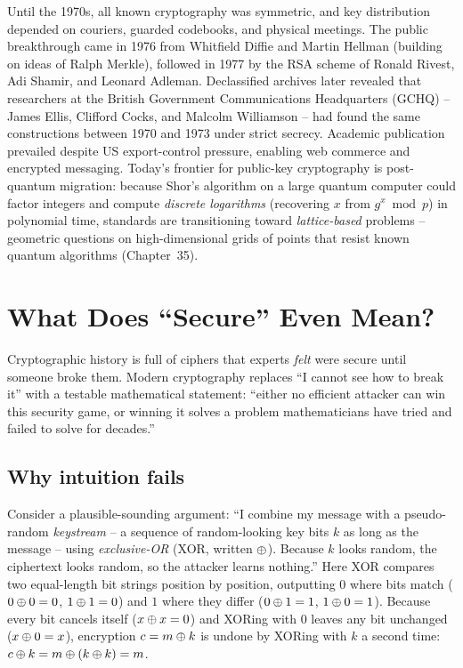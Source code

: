 \begin{historybox}
Until the 1970s, all known cryptography was symmetric, and key distribution depended on couriers, guarded codebooks, and physical meetings. The public breakthrough came in 1976 from Whitfield Diffie and Martin Hellman (building on ideas of Ralph Merkle), followed in 1977 by the RSA scheme of Ronald Rivest, Adi Shamir, and Leonard Adleman. Declassified archives later revealed that researchers at the British Government Communications Headquarters (GCHQ) -- James Ellis, Clifford Cocks, and Malcolm Williamson -- had found the same constructions between 1970 and 1973 under strict secrecy. Academic publication prevailed despite US export-control pressure, enabling web commerce and encrypted messaging. Today's frontier for public-key cryptography is post-quantum migration: because Shor's algorithm on a large quantum computer could factor integers and compute \emph{discrete logarithms} (recovering $x$ from $g^x \bmod p$) in polynomial time, standards are transitioning toward \emph{lattice-based} problems -- geometric questions on high-dimensional grids of points that resist known quantum algorithms (Chapter~35).
\end{historybox}

\section{What Does ``Secure'' Even Mean?}
\label{ch01:what-is-secure}

Cryptographic history is full of ciphers that experts \emph{felt} were secure until someone broke them. Modern cryptography replaces ``I cannot see how to break it'' with a testable mathematical statement: ``either no efficient attacker can win this security game, or winning it solves a problem mathematicians have tried and failed to solve for decades.''

\subsection*{Why intuition fails}

Consider a plausible-sounding argument: ``I combine my message with a pseudo-random \emph{keystream} -- a sequence of random-looking key bits $k$ as long as the message -- using \emph{exclusive-OR} (XOR, written $\oplus$). Because $k$ looks random, the ciphertext looks random, so the attacker learns nothing.'' Here XOR compares two equal-length bit strings position by position, outputting $0$ where bits match ($0 \oplus 0 = 0$, $1 \oplus 1 = 0$) and $1$ where they differ ($0 \oplus 1 = 1$, $1 \oplus 0 = 1$). Because every bit cancels itself ($x \oplus x = 0$) and XORing with $0$ leaves any bit unchanged ($x \oplus 0 = x$), encryption $c = m \oplus k$ is undone by XORing with $k$ a second time: $c \oplus k = m \oplus (k \oplus k) = m$.

